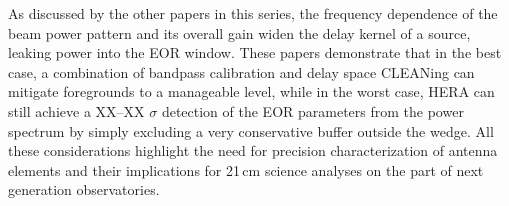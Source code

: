 \documentclass{emulateapj}
\begin{document}


As discussed by the other papers in this series, the frequency dependence of the beam power pattern and its overall gain widen the delay kernel of a source, leaking power into the EOR window. These papers demonstrate that in the best case, a combination of bandpass calibration and delay space CLEANing can mitigate foregrounds to a manageable level, while in the worst case, HERA can still achieve a XX--XX $\sigma$ detection of the EOR parameters from the power spectrum by simply excluding a very conservative buffer outside the wedge. All these considerations highlight the need for precision characterization of antenna elements and their implications for 21\,cm science analyses on the part of next generation observatories.









\end{document}
